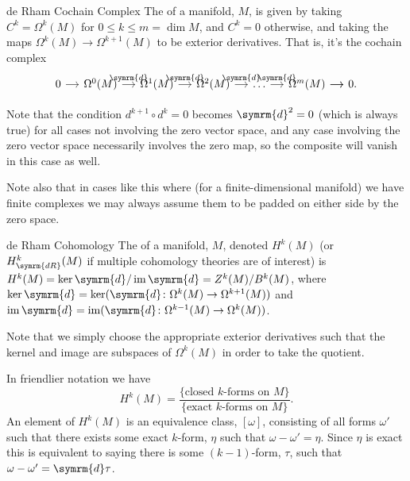 \documentclass[fleqn]{NotesClass}
\renewcommand{\dl}{\symrm{d}}
\DeclareMathOperator{\im}{im}
\begin{document}
    \begin{dfn}{de Rham Cochain Complex}{}
        The  of a manifold, \(M\), is given by taking \(C^k = \Omega^k(M)\) for \(0 \le k \le m = \dim M\), and \(C^k = 0\) otherwise, and taking the maps \(\Omega^k(M) \to \Omega^{k+1}(M)\) to be exterior derivatives.
        That is, it's the cochain complex
        \begin{equation*}
            \begin{tikzcd}[column sep=small]
                0 \arrow[r] & \Omega^0(M) \arrow[r, "\dl"] & \Omega^1(M) \arrow[r, "\dl"] & \Omega^2(M) \arrow[r, "\dl"] & \dots \arrow[r, "\dl"] & \Omega^m(M) \arrow[r] \arrow[r] & 0.
            \end{tikzcd}
        \end{equation*}
    \end{dfn}
    
    Note that the condition \(d^{k+1} \circ d^k = 0\) becomes \(\dl^2 = 0\) (which is always true) for all cases not involving the zero vector space, and any case involving the zero vector space necessarily involves the zero map, so the composite will vanish in this case as well.
    
    Note also that in cases like this where (for a finite-dimensional manifold) we have finite complexes we may always assume them to be padded on either side by the zero space.
    
    \begin{dfn}{de Rham Cohomology}{}
        The  of a manifold, \(M\), denoted \(H^k(M)\) (or \(H^k_{\symrm{dR}}(M)\) if multiple cohomology theories are of interest) is \(H^k(M) = \ker \dl/\im \dl = Z^k(M)/B^k(M)\), where \(\ker \dl = \ker(\dl \colon \Omega^k(M) \to \Omega^{k + 1}(M))\) and \(\im \dl = \im (\dl \colon \Omega^{k-1}(M) \to \Omega^k(M))\).
    \end{dfn}
    
    Note that we simply choose the appropriate exterior derivatives such that the kernel and image are subspaces of \(\Omega^k(M)\) in order to take the quotient.
    
    In friendlier notation we have
    \begin{equation}
        H^k(M) = \frac{\{\text{closed \(k\)-forms on \(M\)}\}}{\{\text{exact \(k\)-forms on \(M\)}\}}.
    \end{equation}
    An element of \(H^k(M)\) is an equivalence class, \([\omega]\), consisting of all forms \(\omega'\) such that there exists some exact \(k\)-form, \(\eta\) such that \(\omega - \omega' = \eta\).
    Since \(\eta\) is exact this is equivalent to saying there is some \((k - 1)\)-form, \(\tau\), such that \(\omega - \omega' = \dl \tau\).
    
\end{document}
